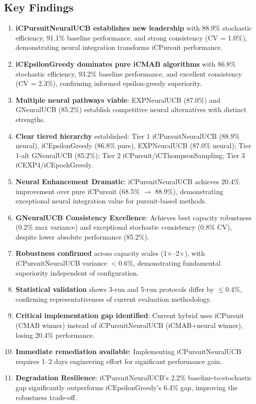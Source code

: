 \documentclass[12pt,a4paper]{article}
\newcommand{\primarytext}[1]{\textcolor{primaryblue}{\textbf{#1}}}
\newcommand{\secondarytext}[1]{\textcolor{secondaryblue}{\textbf{#1}}}
\newcommand{\success}[1]{\textcolor{accentgreen}{\textbf{#1}}}
\newcommand{\warning}[1]{\textcolor{warningred}{\textbf{#1}}}
\newcommand{\neural}[1]{\textcolor{neuralcolor}{\textbf{#1}}}
\begin{document}
\subsection{Key Findings}
\begin{enumerate}
\item \neural{iCPursuitNeuralUCB establishes new leadership} with 88.9\% stochastic efficiency, 91.1\% baseline performance, and strong consistency (CV = 1.0\%), demonstrating neural integration transforms iCPursuit performance.
\item \primarytext{iCEpsilonGreedy dominates pure iCMAB algorithms} with 86.8\% stochastic efficiency, 93.2\% baseline performance, and excellent consistency (CV = 2.3\%), confirming informed epsilon-greedy superiority.
\item \neural{Multiple neural pathways viable}: EXPNeuralUCB (87.0\%) and GNeuralUCB (85.2\%) establish competitive neural alternatives with distinct strengths.
\item \secondarytext{Clear tiered hierarchy} established: Tier 1 iCPursuitNeuralUCB (88.9\% neural), iCEpsilonGreedy (86.8\% pure), EXPNeuralUCB (87.0\% neural); Tier 1-alt GNeuralUCB (85.2\%); Tier 2 iCPursuit/iCThompsonSampling; Tier 3 iCEXP4/iCEpochGreedy.
\item \success{Neural Enhancement Dramatic}: iCPursuitNeuralUCB achieves 20.4\% improvement over pure iCPursuit (68.5\% $\rightarrow$ 88.9\%), demonstrating exceptional neural integration value for pursuit-based methods.
\item \neural{GNeuralUCB Consistency Excellence}: Achieves best capacity robustness (0.2\% max variance) and exceptional stochastic consistency (0.8\% CV), despite lower absolute performance (85.2\%).
\item \success{Robustness confirmed} across capacity scales (1$\times$--2$\times$), with iCPursuitNeuralUCB variance $<$0.6\%, demonstrating fundamental superiority independent of configuration.
\item \success{Statistical validation} shows 3-run and 5-run protocols differ by $\leq$0.4\%, confirming representativeness of current evaluation methodology.
\item \warning{Critical implementation gap identified}: Current hybrid uses iCPursuit (CMAB winner) instead of iCPursuitNeuralUCB (iCMAB+neural winner), losing 20.4\% performance.
\item \success{Immediate remediation available}: Implementing iCPursuitNeuralUCB requires 1--2 days engineering effort for significant performance gain.
\item \success{Degradation Resilience}: iCPursuitNeuralUCB's 2.2\% baseline-to-stochastic gap significantly outperforms iCEpsilonGreedy's 6.4\% gap, improving the robustness trade-off.
\end{enumerate}
\end{document}
